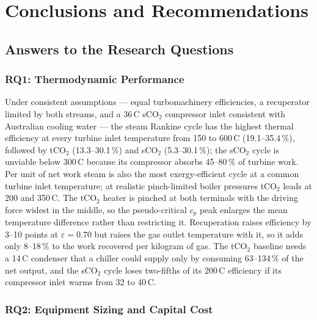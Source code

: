 \documentclass[12pt,a4paper]{report}
\begin{document}
\chapter{Conclusions and Recommendations}
\label{ch:conclusions}

\section{Answers to the Research Questions}
\label{sec:answers}

\subsection{RQ1: Thermodynamic Performance}

Under consistent assumptions --- equal turbomachinery efficiencies, a
recuperator limited by both streams, and a 36\,\textdegree C sCO$_2$
compressor inlet consistent with Australian cooling water --- the steam
Rankine cycle has the highest thermal efficiency at every turbine inlet
temperature from 150 to 600\,\textdegree C (19.1--35.4\,\%), followed by
tCO$_2$ (13.3--30.1\,\%) and sCO$_2$ (5.3--30.1\,\%); the sCO$_2$ cycle is
unviable below 300\,\textdegree C because its compressor absorbs 45--80\,\%
of turbine work. Per unit of net work steam is also the most
exergy-efficient cycle at a common turbine inlet temperature; at realistic
pinch-limited boiler pressures tCO$_2$ leads at 200 and 350\,\textdegree C.
The tCO$_2$ heater is pinched at both terminals with the driving force
widest in the middle, so the pseudo-critical $c_p$ peak enlarges the mean
temperature difference rather than restricting it. Recuperation raises
efficiency by 3--10 points at $\varepsilon = 0.70$ but raises the gas outlet
temperature with it, so it adds only 8--18\,\% to the work recovered per
kilogram of gas. The tCO$_2$ baseline needs a 14\,\textdegree C condenser
that a chiller could supply only by consuming 63--134\,\% of the net
output, and the sCO$_2$ cycle loses two-fifths of its 200\,\textdegree C
efficiency if its compressor inlet warms from 32 to 40\,\textdegree C.

\subsection{RQ2: Equipment Sizing and Capital Cost}
\end{document}
